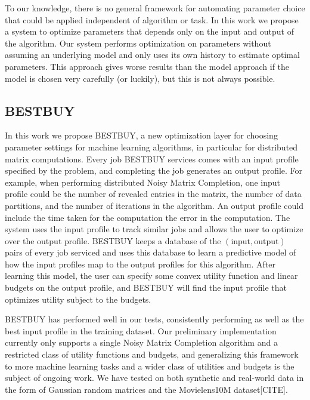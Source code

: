 To our knowledge, there is no general framework for automating parameter choice that could be applied independent of algorithm or task. In this work we propose a system to optimize parameters that depends only on the input and output of the algorithm. Our system performs optimization on parameters without assuming an underlying model and only uses its own history to estimate optimal parameters. This approach gives worse results than the model approach if the model is chosen very carefully (or luckily), but this is not always possible.

\subsection{BESTBUY}
In this work we propose BESTBUY, a new optimization layer for choosing parameter settings for machine learning algorithms, in particular for distributed matrix computations. Every job BESTBUY services comes with an input profile specified by the problem, and completing the job generates an output profile. For example, when performing distributed Noisy Matrix Completion, one input profile could be the number of revealed entries in the matrix, the number of data partitions, and the number of iterations in the algorithm. An output profile could include the time taken for the computation the error in the computation. The system uses the input profile to track similar jobs and allows the user to optimize over the output profile. BESTBUY keeps a database of the $(\text{input},\text{output})$ pairs of every job serviced and uses this database to learn a predictive model of how the input profiles map to the output profiles for this algorithm. After learning this model, the user can specify some convex utility function and linear budgets on the output profile, and BESTBUY will find the input profile that optimizes utility subject to the budgets. 

BESTBUY has performed well in our tests, consistently performing as well as the best input profile in the training dataset. Our preliminary implementation currently only supports a single Noisy Matrix Completion algorithm and a restricted class of utility functions and budgets, and generalizing this framework to more machine learning tasks and a wider class of utilities and budgets is the subject of ongoing work. We have tested on both synthetic and real-world data in the form of Gaussian random matrices and the Movielens10M dataset[CITE]. 

